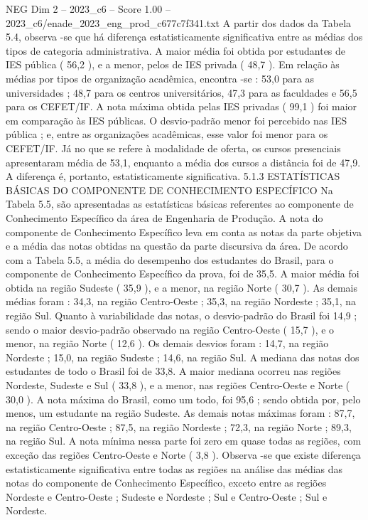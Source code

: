 \begin{textsample}{NEG Dim 2 – 2023\_c6 – Score 1.00 – 2023\_c6/enade\_2023\_eng\_prod\_c677c7f341.txt}
A partir dos dados da Tabela 5.4, observa -se que há diferença estatisticamente significativa entre as médias dos tipos de categoria administrativa.
A maior média foi obtida por estudantes de IES pública ( 56,2 ), e a menor, pelos de IES privada ( 48,7 ).
Em relação às médias por tipos de organização acadêmica, encontra -se : 53,0 para as universidades ; 48,7 para os centros universitários, 47,3 para as faculdades e 56,5 para os CEFET/IF.
A nota máxima obtida pelas IES privadas ( 99,1 ) foi maior em comparação às IES públicas.
O desvio-padrão menor foi percebido nas IES pública ; e, entre as organizações acadêmicas, esse valor foi menor para os CEFET/IF.
Já no que se refere à modalidade de oferta, os cursos presenciais apresentaram média de 53,1, enquanto a média dos cursos a distância foi de 47,9.
A diferença é, portanto, estatisticamente significativa. 5.1.3 ESTATÍSTICAS BÁSICAS DO COMPONENTE DE CONHECIMENTO ESPECÍFICO Na Tabela 5.5, são apresentadas as estatísticas básicas referentes ao componente de Conhecimento Específico da área de Engenharia de Produção.
A nota do componente de Conhecimento Específico leva em conta as notas da parte objetiva e a média das notas obtidas na questão da parte discursiva da área.
De acordo com a Tabela 5.5, a média do desempenho dos estudantes do Brasil, para o componente de Conhecimento Específico da prova, foi de 35,5.
A maior média foi obtida na região Sudeste ( 35,9 ), e a menor, na região Norte ( 30,7 ).
As demais médias foram : 34,3, na região Centro-Oeste ; 35,3, na região Nordeste ; 35,1, na região Sul.
Quanto à variabilidade das notas, o desvio-padrão do Brasil foi 14,9 ; sendo o maior desvio-padrão observado na região Centro-Oeste ( 15,7 ), e o menor, na região Norte ( 12,6 ).
Os demais desvios foram : 14,7, na região Nordeste ; 15,0, na região Sudeste ; 14,6, na região Sul.
A mediana das notas dos estudantes de todo o Brasil foi de 33,8.
A maior mediana ocorreu nas regiões Nordeste, Sudeste e Sul ( 33,8 ), e a menor, nas regiões Centro-Oeste e Norte ( 30,0 ).
A nota máxima do Brasil, como um todo, foi 95,6 ; sendo obtida por, pelo menos, um estudante na região Sudeste.
As demais notas máximas foram : 87,7, na região Centro-Oeste ; 87,5, na região Nordeste ; 72,3, na região Norte ; 89,3, na região Sul.
A nota mínima nessa parte foi zero em quase todas as regiões, com exceção das regiões Centro-Oeste e Norte ( 3,8 ).
Observa -se que existe diferença estatisticamente significativa entre todas as regiões na análise das médias das notas do componente de Conhecimento Específico, exceto entre as regiões Nordeste e Centro-Oeste ; Sudeste e Nordeste ; Sul e Centro-Oeste ; Sul e Nordeste.

\end{textsample}
